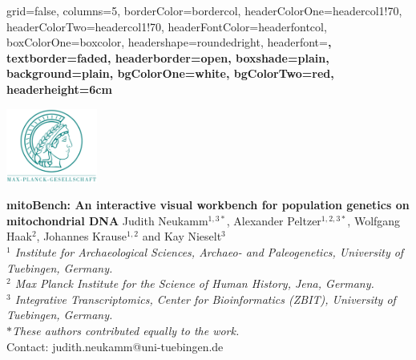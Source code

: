 \documentclass[a0paper,portrait]{baposter}
\begin{document}

\begin{poster}{
	grid=false,
	columns=5,
	borderColor=bordercol,
	headerColorOne=headercol1!70,%
	headerColorTwo=headercol1!70,%
	headerFontColor=headerfontcol,
	boxColorOne=boxcolor,
	headershape=roundedright,
	headerfont=\large\sf\bf,
	textborder=faded,%
	headerborder=open,
  	boxshade=plain,
	background=plain,
	bgColorOne=white,
	bgColorTwo=red,
	headerheight=6cm
}
{

	\includegraphics[width=3cm]{figures/Max-Planck-Gesellschaft.png}

}
{\Large\bf
	mitoBench: An interactive visual workbench for population genetics on mitochondrial DNA
}
{
	\vspace{1em} Judith Neukamm$^{1,3*}$, Alexander Peltzer$^{1,2,3*}$, Wolfgang Haak$^{2}$, Johannes Krause$^{1,2}$ and Kay Nieselt$^{3}$\\
	{\footnotesize \textit{$^1$ Institute for Archaeological Sciences, Archaeo- and Paleogenetics, University of Tuebingen, Germany.\\
	$^2$ Max Planck Institute for the Science of Human History, Jena, Germany.\\
	$^3$ Integrative Transcriptomics, Center for Bioinformatics (ZBIT), University of Tuebingen, Germany.\\
	$*$These authors contributed equally to the work.}\\
	\vspace{1em}
	Contact: judith.neukamm@uni-tuebingen.de
	}
}
{

}
\end{poster}
\end{document}

